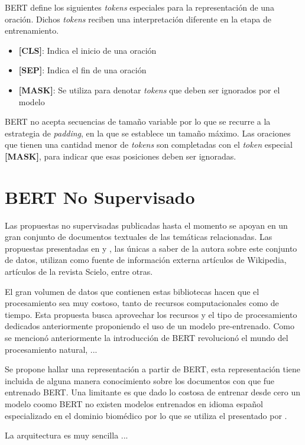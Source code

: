 BERT define los siguientes \textit{tokens} especiales para la representación de una oración. Dichos \textit{tokens} reciben una interpretación diferente en la etapa de entrenamiento.
\begin{itemize}
  \item \textbf{[CLS]}: Indica el inicio de una oración
  \item \textbf{[SEP]}: Indica el fin de una oración
  \item \textbf{[MASK]}: Se utiliza para denotar \textit{tokens} que deben ser ignorados por el modelo
\end{itemize}

BERT no acepta secuencias de tamaño variable por lo que se recurre a la estrategia de \textit{padding}, en la que se establece un tamaño máximo. Las oraciones que tienen una cantidad menor de \textit{tokens} son completadas con el \textit{token} especial \textbf{[MASK]}, para indicar que esas posiciones deben ser ignoradas.

\section{BERT No Supervisado}

Las propuestas no supervisadas publicadas hasta el momento se apoyan en un gran conjunto de documentos textuales de las temáticas relacionadas. Las propuestas presentadas en \cite{2019-head-qa} y \cite{2020-multi-step}, las únicas a saber de la autora sobre este conjunto de datos, utilizan como fuente de información externa artículos de Wikipedia, artículos de la revista Scielo, entre otras. 

El gran volumen de datos que contienen estas bibliotecas hacen que el procesamiento sea muy costoso, tanto de recursos computacionales como de tiempo. Esta propuesta busca aprovechar los recursos y el tipo de procesamiento dedicados anteriormente proponiendo el uso de un modelo pre-entrenado. Como se mencionó anteriormente la introducción de BERT revolucionó el mundo del procesamiento natural, ...

Se propone hallar una representación a partir de BERT, esta representación tiene incluida de alguna manera conocimiento sobre los documentos con que fue entrenado BERT.
Una limitante es que dado lo costosa de entrenar desde cero un modelo coomo BERT no existen modelos entrenados en idioma español especializado en el dominio biomédico por lo que se utiliza el presentado por \cite{2020-spanish-bert}.

La arquitectura es muy sencilla ...





